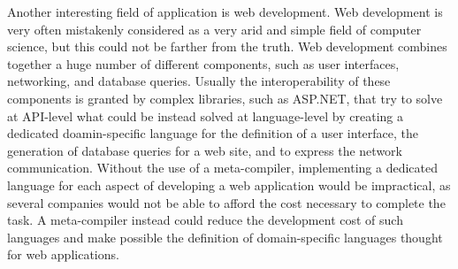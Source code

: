 Another interesting field of application is web development. Web development is very often mistakenly considered as a very arid and simple field of computer science, but this could not be farther from the truth. Web development combines together a huge number of different components, such as user interfaces, networking, and database queries. Usually the interoperability of these components is granted by complex libraries, such as ASP.NET, that try to solve at API-level what could be instead solved at language-level by creating a dedicated doamin-specific language for the definition of a user interface, the generation of database queries for a web site, and to express the network communication. Without the use of a meta-compiler, implementing a dedicated language for each aspect of developing a web application would be impractical, as several companies would not be able to afford the cost necessary to complete the task. A meta-compiler instead could reduce the development cost of such languages and make possible the definition of domain-specific languages thought for web applications.

